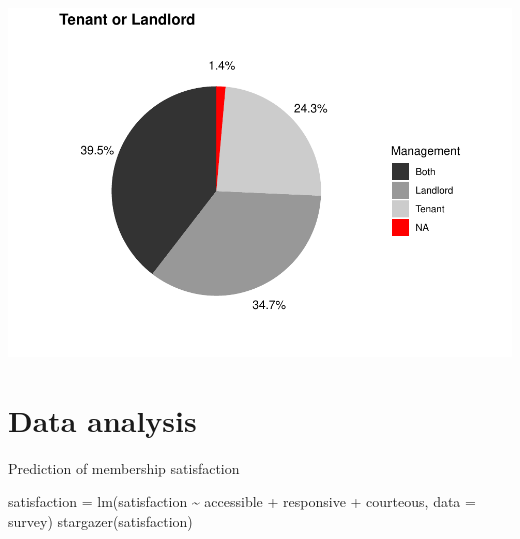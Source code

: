 \documentclass[
]{article}
\newenvironment{Shaded}{\begin{snugshade}}{\end{snugshade}}
\newcommand{\AttributeTok}[1]{\textcolor[rgb]{0.77,0.63,0.00}{#1}}
\newcommand{\FunctionTok}[1]{\textcolor[rgb]{0.00,0.00,0.00}{#1}}
\newcommand{\NormalTok}[1]{#1}
\newcommand{\OtherTok}[1]{\textcolor[rgb]{0.56,0.35,0.01}{#1}}
\newcommand{\SpecialCharTok}[1]{\textcolor[rgb]{0.00,0.00,0.00}{#1}}
\begin{document}
\includegraphics{pcca_survey_files/figure-latex/tenant-all-1.pdf}

\hypertarget{data-analysis}{%
\section{Data analysis}\label{data-analysis}}

Prediction of membership satisfaction

\begin{Shaded}
\begin{Highlighting}[]
\NormalTok{satisfaction }\OtherTok{=} \FunctionTok{lm}\NormalTok{(satisfaction }\SpecialCharTok{\textasciitilde{}}\NormalTok{ accessible }\SpecialCharTok{+}\NormalTok{ responsive }\SpecialCharTok{+}\NormalTok{ courteous,}
    \AttributeTok{data =}\NormalTok{ survey)}
\FunctionTok{stargazer}\NormalTok{(satisfaction)}
\end{Highlighting}
\end{Shaded}
\end{document}
